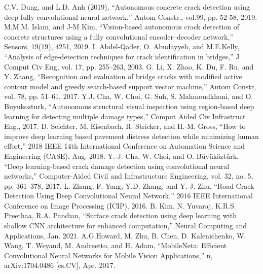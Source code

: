 \documentclass[conference]{IEEEtran}
\begin{document}
\begin{thebibliography}{00}
 C.V. Dung, and L.D. Anh (2019), “Autonomous concrete crack detection using deep fully convolutional neural network,” Autom Constr., vol.99, pp. 52-58, 2019.
 M.M.M. Islam, and J-M Kim, “Vision-based autonomous crack detection of concrete structures using a fully convolutional encoder–decoder network,” Sensors, 19(19), 4251, 2019.
 I. Abdel-Qader, O. Abudayyeh, and M.E.Kelly, “Analysis of edge-detection techniques for crack identification in bridges,” J Comput Civ Eng, vol. 17, pp. 255–263, 2003.
 G. Li, X. Zhao, K. Du, F. Ru, and Y. Zhang, “Recognition and evaluation of bridge cracks with modified active contour model and greedy search-based support vector machine,” Autom Constr, vol. 78, pp. 51–61, 2017.
 Y.J. Cha, W. Choi, G. Suh, S. Mahmoudkhani, and O. Buyukozturk, “Autonomous structural visual inspection using region-based deep learning for detecting multiple damage types,” Comput Aided Civ Infrastruct Eng., 2017.
 D. Seichter, M. Eisenbach, R. Stricker, and H.-M. Gross, “How to improve deep learning based pavement distress detection while minimizing human effort,” 2018 IEEE 14th International Conference on Automation Science and Engineering (CASE), Aug. 2018.
 Y.-J. Cha, W. Choi, and O. Büyüköztürk, “Deep learning-based crack damage detection using convolutional neural networks,” Computer-Aided Civil and Infrastructure Engineering, vol. 32, no. 5, pp. 361–378, 2017.
 L. Zhang, F. Yang, Y.D. Zhang, and Y. J. Zhu, “Road Crack Detection Using Deep Convolutional Neural Network,” 2016 IEEE International Conference on Image Processing (ICIP), 2016.
 B. Kim, N. Yuvaraj, K.R.S. Preethaa, R.A. Pandian, “Surface crack detection using deep learning with shallow CNN architecture for enhanced computation,” Neural Computing and Applications, Jan. 2021.
 A.G.Howard, M. Zhu, B. Chen, D. Kalenichenko, W. Wang, T. Weyand, M. Andreetto, and H. Adam, “MobileNeta: Efficient Convolutional Neural Networks for Mobile Vision Applications,” n, arXiv:1704.0486 [cs.CV], Apr. 2017.
\end{thebibliography}
\vspace{14pt}
\end{document}
